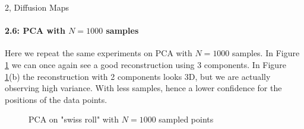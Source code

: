 \begin{task}{2, Diffusion Maps}
\paragraph{2.6: PCA with $N=1000$ samples}
Here we repeat the same experiments on PCA with $N=1000$ samples. In Figure \ref{fig:t2_2-pca1k} we can once again see a good reconstruction using 3 components.  In Figure \ref{fig:t2_2-pca1k}(b) the reconstruction with 2 components looks 3D, but we are actually observing high variance. With less samples, hence a lower confidence for the positions of the data points.
\begin{figure}[H]
\centering
{}
\caption{PCA on "swiss roll" with $N=1000$ sampled points}
\label{fig:t2_2-pca1k}
\end{figure}


\end{task}
